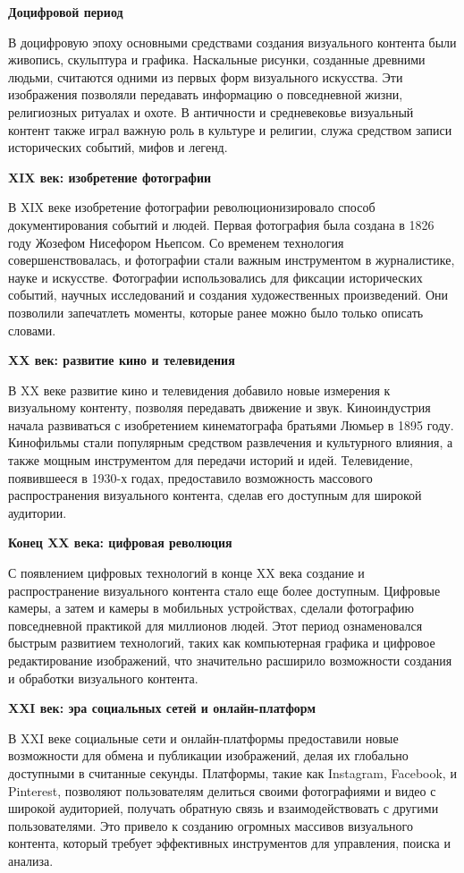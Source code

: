 \textbf{Доцифровой период}

В доцифровую эпоху основными средствами создания визуального контента были живопись, скульптура и графика. Наскальные рисунки, созданные древними людьми, считаются одними из первых форм визуального искусства. Эти изображения позволяли передавать информацию о повседневной жизни, религиозных ритуалах и охоте. В античности и средневековье визуальный контент также играл важную роль в культуре и религии, служа средством записи исторических событий, мифов и легенд.

\textbf{XIX век: изобретение фотографии}

В XIX веке изобретение фотографии революционизировало способ документирования событий и людей. Первая фотография была создана в 1826 году Жозефом Нисефором Ньепсом. Со временем технология совершенствовалась, и фотографии стали важным инструментом в журналистике, науке и искусстве. Фотографии использовались для фиксации исторических событий, научных исследований и создания художественных произведений. Они позволили запечатлеть моменты, которые ранее можно было только описать словами.

\textbf{XX век: развитие кино и телевидения}

В XX веке развитие кино и телевидения добавило новые измерения к визуальному контенту, позволяя передавать движение и звук. Киноиндустрия начала развиваться с изобретением кинематографа братьями Люмьер в 1895 году. Кинофильмы стали популярным средством развлечения и культурного влияния, а также мощным инструментом для передачи историй и идей. Телевидение, появившееся в 1930-х годах, предоставило возможность массового распространения визуального контента, сделав его доступным для широкой аудитории.

\textbf{Конец XX века: цифровая революция}

С появлением цифровых технологий в конце XX века создание и распространение визуального контента стало еще более доступным. Цифровые камеры, а затем и камеры в мобильных устройствах, сделали фотографию повседневной практикой для миллионов людей. Этот период ознаменовался быстрым развитием технологий, таких как компьютерная графика и цифровое редактирование изображений, что значительно расширило возможности создания и обработки визуального контента.

\textbf{XXI век: эра социальных сетей и онлайн-платформ}

В XXI веке социальные сети и онлайн-платформы предоставили новые возможности для обмена и публикации изображений, делая их глобально доступными в считанные секунды. Платформы, такие как Instagram, Facebook, и Pinterest, позволяют пользователям делиться своими фотографиями и видео с широкой аудиторией, получать обратную связь и взаимодействовать с другими пользователями. Это привело к созданию огромных массивов визуального контента, который требует эффективных инструментов для управления, поиска и анализа.

